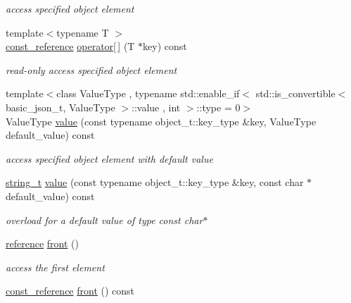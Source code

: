 \begin{DoxyCompactItemize}
\begin{DoxyCompactList}\small\item\em access specified object element \end{DoxyCompactList}\item 
{\footnotesize template$<$typename T $>$ }\\\hyperlink{a00025_af677a29b0e66edc9f66e5167e4667071}{const\+\_\+reference} \hyperlink{a00025_aa6fd72df1ce9f80e61012784c598456e}{operator\mbox{[}$\,$\mbox{]}} (T $\ast$key) const 
\begin{DoxyCompactList}\small\item\em read-\/only access specified object element \end{DoxyCompactList}\item 
{\footnotesize template$<$class Value\+Type , typename std\+::enable\+\_\+if$<$                                                                  std\+::is\+\_\+convertible$<$ basic\+\_\+json\+\_\+t, Value\+Type $>$\+::value                                                               , int $>$\+::type  = 0$>$ }\\Value\+Type \hyperlink{a00025_a0a2cbbd95862a623e7dc5c37e67dead0}{value} (const typename object\+\_\+t\+::key\+\_\+type \&key, Value\+Type default\+\_\+value) const 
\begin{DoxyCompactList}\small\item\em access specified object element with default value \end{DoxyCompactList}\item 
\hyperlink{a00025_ab63e618bbb0371042b1bec17f5891f42}{string\+\_\+t} \hyperlink{a00025_af071057ebab57744f5767eb369e99d42}{value} (const typename object\+\_\+t\+::key\+\_\+type \&key, const char $\ast$default\+\_\+value) const 
\begin{DoxyCompactList}\small\item\em overload for a default value of type const char$\ast$ \end{DoxyCompactList}\item 
\hyperlink{a00025_a3ec8e17be8732fe436e9d6733f52b7a3}{reference} \hyperlink{a00025_aa45753034bea87f9d2c0c42ace9ff75c}{front} ()
\begin{DoxyCompactList}\small\item\em access the first element \end{DoxyCompactList}\item 
\hyperlink{a00025_af677a29b0e66edc9f66e5167e4667071}{const\+\_\+reference} \hyperlink{a00025_a8032645ce3109a7a4899badd90fa3480}{front} () const 

\end{DoxyCompactItemize}
